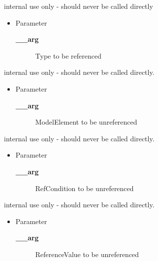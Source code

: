 \begin{desc}internal use only - should never be called directly
\begin{itemize}
\item{Parameter
  \begin{description}
   \item[{\bf \_\_arg}]{Type to be referenced}
  \end{description}}
\end{itemize}
\end{desc}

\begin{desc}internal use only - should never be called directly.
\begin{itemize}
\item{Parameter
  \begin{description}
   \item[{\bf \_\_arg}]{ModelElement to be unreferenced}
  \end{description}}
\end{itemize}
\end{desc}

\begin{desc}internal use only - should never be called directly.
\begin{itemize}
\item{Parameter
  \begin{description}
   \item[{\bf \_\_arg}]{RefCondition to be unreferenced}
  \end{description}}
\end{itemize}
\end{desc}

\begin{desc}internal use only - should never be called directly.
\begin{itemize}
\item{Parameter
  \begin{description}
   \item[{\bf \_\_arg}]{ReferenceValue to be unreferenced}
  \end{description}}
\end{itemize}
\end{desc}

